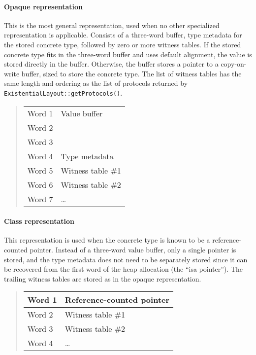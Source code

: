 \documentclass[a4paper,headsepline,bibliography=totoc,toc=flat,fleqn,twoside=semi]{scrbook}
\theoremstyle{definition}
\theoremstyle{definition}
\theoremstyle{definition}
\begin{document}
\paragraph{Opaque representation} This is the most general representation, used when no other specialized representation is applicable. Consists of a three-word buffer, type metadata for the stored concrete type, followed by zero or more witness tables. If the stored concrete type fits in the three-word buffer and uses default alignment, the value is stored directly in the buffer. Otherwise, the buffer stores a pointer to a copy-on-write buffer, sized to store the concrete type. The list of witness tables has the same length and ordering as the list of protocols returned by \texttt{ExistentialLayout::getProtocols()}.

\begin{quote}
\begin{tabular}{|l|l|}
\hline
Word 1&Value buffer\\
Word 2&\\
Word 3&\\
\hline
\hline
Word 4&Type metadata\\
\hline
\hline
Word 5&Witness table \#1\\
Word 6&Witness table \#2\\
Word 7&\ldots\\
\hline
\end{tabular}
\end{quote}

\paragraph{Class representation} This representation is used when the concrete type is known to be a reference-counted pointer. Instead of a three-word value buffer, only a single pointer is stored, and the type metadata does not need to be separately stored since it can be recovered from the first word of the heap allocation (the ``isa pointer''). The trailing witness tables are stored as in the opaque representation.

\begin{quote}
\begin{tabular}{|l|l|}
\hline
Word 1&Reference-counted pointer\\
\hline
\hline
Word 2&Witness table \#1\\
Word 3&Witness table \#2\\
Word 4&\ldots\\
\hline
\end{tabular}
\end{quote}
\end{document}
